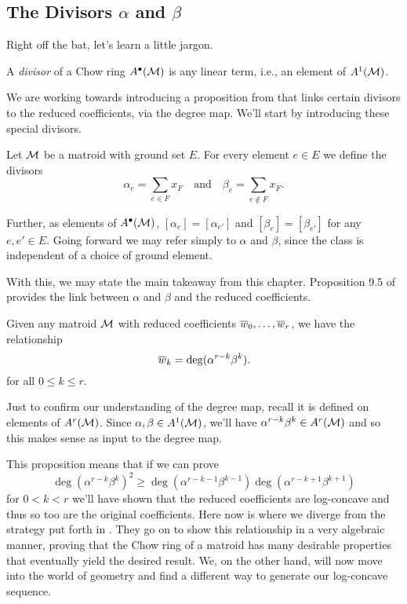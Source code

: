 \documentclass[12pt,oneside]{../../sfsuthesis}
\begin{document}
\subsection{The Divisors \texorpdfstring{\( \alpha \)}{alpha} and \texorpdfstring{\( \beta \)}{beta}}
Right off the bat, let's learn a little jargon.
\begin{definition}[Divisor]
    A \emph{divisor} of a Chow ring \( A^\bullet(\mathcal{M}) \) is any linear term, i.e., an element of \( A^1(\mathcal{M}) \).
\end{definition}
We are working towards introducing a proposition from \cite{adiprasitoHodgeTheoryCombinatorial2018} that links certain divisors to the reduced coefficients, via the degree map.
We'll start by introducing these special divisors.
\begin{definition}\label{def:alphaBeta}
    Let \( \mathcal{M} \) be a matroid with ground set \( E \).
    For every element \( e \in E \) we define the divisors
    \[
        \alpha_e = \sum_{e \in F} x_F \quad \text{and} \quad \beta_e = \sum_{e \notin F}x_F.
    \]

    Further, as elements of \( A^\bullet(\mathcal{M}) \), \([\alpha_{e}] = [\alpha_{e'}] \) and \([\beta_{e}] = [\beta_{e'}] \) for any \( e, e' \in E \).
    Going forward we may refer simply to \( \alpha \) and \( \beta \), since the class is independent of a choice of ground element.
\end{definition}

With this, we may state the main takeaway from this chapter.
Proposition 9.5 of \cite{adiprasitoHodgeTheoryCombinatorial2018} provides the link between \( \alpha \) and \( \beta \) and the reduced coefficients.
\begin{proposition}\th\label{thm:coeffIsDeg}
    Given any matroid \( \mathcal{M} \) with reduced coefficients \( \overline{w}_0, \dots, \overline{w}_r \), we have the relationship
    \[
        \overline{w}_k = \deg(\alpha^{r-k}\beta^k).
    \]
    for all \( 0 \leq k \leq r \).
\end{proposition}
Just to confirm our understanding of the degree map, recall it is defined on elements of \( A^r(\mathcal{M}) \).
Since \( \alpha, \beta \in A^1(\mathcal{M})\), we'll have \( \alpha^{r-k}\beta^k \in A^r(\mathcal{M}) \) and so this makes sense as input to the degree map.

This proposition means that if we can prove
\[
    \deg(\alpha^{r-k}\beta^k)^2 \geq \deg(\alpha^{r-k-1}\beta^{k-1}) \deg(\alpha^{r-k+1}\beta^{k+1})
\]
for \( 0 < k < r \) we'll have shown that the reduced coefficients are log-concave and thus so too are the original coefficients.
Here now is where we diverge from the strategy put forth in \cite{adiprasitoHodgeTheoryCombinatorial2018}.
They go on to show this relationship in a very algebraic manner, proving that the Chow ring of a matroid has many desirable properties that eventually yield the desired result.
We, on the other hand, will now move into the world of geometry and find a different way to generate our log-concave sequence.
\end{document}
